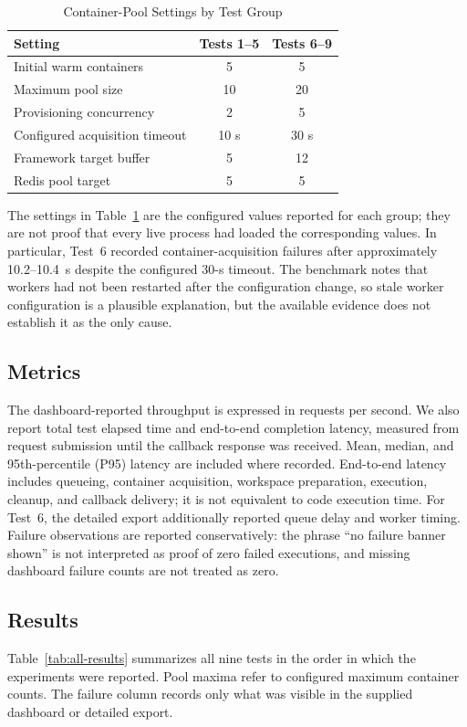 \begin{table}[t]
\centering
\caption{Container-Pool Settings by Test Group}
\label{tab:pool-settings}
\renewcommand{\arraystretch}{1.12}
\setlength{\tabcolsep}{3.4pt}
\begin{tabular}{p{}cc}
\toprule
\textbf{Setting} & \textbf{Tests 1--5} & \textbf{Tests 6--9} \\
\midrule
Initial warm containers & 5 & 5 \\
Maximum pool size & 10 & 20 \\
Provisioning concurrency & 2 & 5 \\
Configured acquisition timeout & 10 s & 30 s \\
Framework target buffer & 5 & 12 \\
Redis pool target & 5 & 5 \\
\bottomrule
\end{tabular}
\end{table}

The settings in Table~\ref{tab:pool-settings} are the configured values reported for each group; they are not proof that every live process had loaded the corresponding values. In particular, Test~6 recorded container-acquisition failures after approximately 10.2--10.4~s despite the configured 30-s timeout. The benchmark notes that workers had not been restarted after the configuration change, so stale worker configuration is a plausible explanation, but the available evidence does not establish it as the only cause.

\subsection{Metrics}
The dashboard-reported throughput is expressed in requests per second. We also report total test elapsed time and end-to-end completion latency, measured from request submission until the callback response was received. Mean, median, and 95th-percentile (P95) latency are included where recorded. End-to-end latency includes queueing, container acquisition, workspace preparation, execution, cleanup, and callback delivery; it is not equivalent to code execution time. For Test~6, the detailed export additionally reported queue delay and worker timing. Failure observations are reported conservatively: the phrase ``no failure banner shown'' is not interpreted as proof of zero failed executions, and missing dashboard failure counts are not treated as zero.

\subsection{Results}
Table~\ref{tab:all-results} summarizes all nine tests in the order in which the experiments were reported. Pool maxima refer to configured maximum container counts. The failure column records only what was visible in the supplied dashboard or detailed export.

